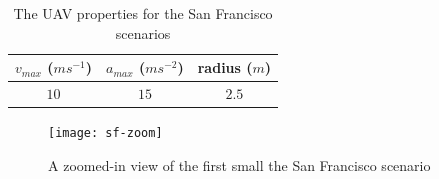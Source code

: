 \begin{table}[h]
\centering
\begin{tabular}{ c | c | c }
$v_{max}$ ($ms^{-1}$)	& $a_{max}$ ($ms^{-2}$) 	& radius ($m$) 	 \\
\hline
$10$ & $15$ 	& $2.5$ \\
\end{tabular}
\caption{The UAV properties for the San Francisco scenarios}
\label{table:uav-sf}
\end{table}

\begin{figure}[h]
	\centering
	\texttt{[image: sf-zoom]}
	\caption{A zoomed-in view of the first small the San Francisco scenario}
	\label{fig:sf-zoom}
\end{figure}


\begin{figure}
	\centering
	

\end{figure}
